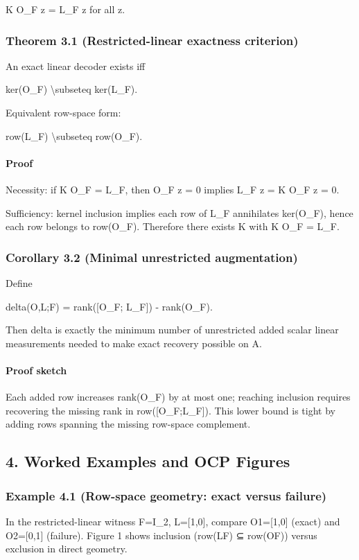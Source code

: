 \documentclass[11pt]{article}
\begin{document}
K O\_F z = L\_F z for all z.


\subsubsection*{Theorem 3.1 (Restricted-linear exactness criterion)}
An exact linear decoder exists iff


ker(O\_F) \textbackslash{}subseteq ker(L\_F).


Equivalent row-space form:


row(L\_F) \textbackslash{}subseteq row(O\_F).


\paragraph{Proof}
Necessity: if K O\_F = L\_F, then O\_F z = 0 implies L\_F z = K O\_F z = 0.

Sufficiency: kernel inclusion implies each row of L\_F annihilates ker(O\_F), hence each row belongs to row(O\_F). Therefore there exists K with K O\_F = L\_F.


\subsubsection*{Corollary 3.2 (Minimal unrestricted augmentation)}
Define


delta(O,L;F) = rank([O\_F; L\_F]) - rank(O\_F).


Then delta is exactly the minimum number of unrestricted added scalar linear measurements needed to make exact recovery possible on A.


\paragraph{Proof sketch}
Each added row increases rank(O\_F) by at most one; reaching inclusion requires recovering the missing rank in row([O\_F;L\_F]). This lower bound is tight by adding rows spanning the missing row-space complement.


\subsection*{4. Worked Examples and OCP Figures}
\subsubsection*{Example 4.1 (Row-space geometry: exact versus failure)}
In the restricted-linear witness F=I\_2, L=[1,0], compare O1=[1,0] (exact) and O2=[0,1] (failure). Figure 1 shows inclusion (row(LF) ⊆ row(OF)) versus exclusion in direct geometry.
\end{document}
